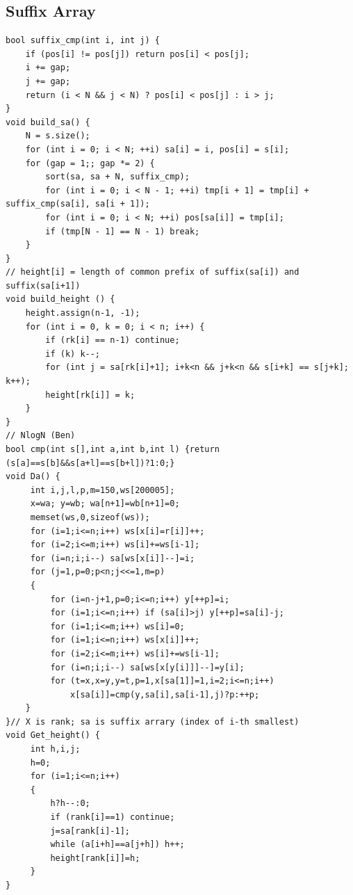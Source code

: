 \documentclass[10pt,letterpaper,landscape]{article}
\begin{document}
\begin{multicols}{2}
\subsection{Suffix Array}
\begin{lstlisting}
bool suffix_cmp(int i, int j) {
    if (pos[i] != pos[j]) return pos[i] < pos[j];
    i += gap;
    j += gap;
    return (i < N && j < N) ? pos[i] < pos[j] : i > j;
}
void build_sa() {
    N = s.size();
    for (int i = 0; i < N; ++i) sa[i] = i, pos[i] = s[i];
    for (gap = 1;; gap *= 2) {
        sort(sa, sa + N, suffix_cmp);
        for (int i = 0; i < N - 1; ++i) tmp[i + 1] = tmp[i] + suffix_cmp(sa[i], sa[i + 1]);
        for (int i = 0; i < N; ++i) pos[sa[i]] = tmp[i];
        if (tmp[N - 1] == N - 1) break;
    }
}
// height[i] = length of common prefix of suffix(sa[i]) and suffix(sa[i+1])
void build_height () {
    height.assign(n-1, -1);
    for (int i = 0, k = 0; i < n; i++) {
        if (rk[i] == n-1) continue;
        if (k) k--;
        for (int j = sa[rk[i]+1]; i+k<n && j+k<n && s[i+k] == s[j+k]; k++);
        height[rk[i]] = k;
    }
}
// NlogN (Ben)
bool cmp(int s[],int a,int b,int l) {return (s[a]==s[b]&&s[a+l]==s[b+l])?1:0;}
void Da() {
     int i,j,l,p,m=150,ws[200005];
     x=wa; y=wb; wa[n+1]=wb[n+1]=0;
     memset(ws,0,sizeof(ws));
     for (i=1;i<=n;i++) ws[x[i]=r[i]]++;
     for (i=2;i<=m;i++) ws[i]+=ws[i-1];
     for (i=n;i;i--) sa[ws[x[i]]--]=i;
     for (j=1,p=0;p<n;j<<=1,m=p)
     {
         for (i=n-j+1,p=0;i<=n;i++) y[++p]=i;
         for (i=1;i<=n;i++) if (sa[i]>j) y[++p]=sa[i]-j;
         for (i=1;i<=m;i++) ws[i]=0;
         for (i=1;i<=n;i++) ws[x[i]]++;
         for (i=2;i<=m;i++) ws[i]+=ws[i-1];
         for (i=n;i;i--) sa[ws[x[y[i]]]--]=y[i];
         for (t=x,x=y,y=t,p=1,x[sa[1]]=1,i=2;i<=n;i++)
             x[sa[i]]=cmp(y,sa[i],sa[i-1],j)?p:++p;
    }
}// X is rank; sa is suffix arrary (index of i-th smallest)
void Get_height() {
     int h,i,j;
     h=0;
     for (i=1;i<=n;i++)
     {
         h?h--:0;
         if (rank[i]==1) continue;
         j=sa[rank[i]-1];
         while (a[i+h]==a[j+h]) h++;
         height[rank[i]]=h;
     }
}
\end{lstlisting}

\end{multicols}
\end{document}
